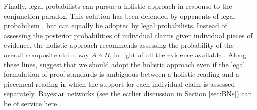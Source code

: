 \documentclass{article}
\begin{document}
 
 
 
 Finally, legal probabilists  can pursue a holistic approach in response to the conjunction paradox. %
 This solution has been defended  by opponents of legal probabilism \citep{Allen1986A-Reconceptuali,AllenPardo2019relative}, but can equally be adopted by legal probabilists. 
   Instead of assessing the posterior probabilities of individual claims given individual pieces of evidence, the holistic approach recommends assessing the probability of the overall composite claim, say $A \wedge B$, in light of all the evidence available \citep{dibello2019TrialStatisticsHigh}. Along these lines, \citet{HeddenColyvan2019legal} suggest that we should adopt the holistic approach even if the legal formulation of proof standards is ambiguous between a holistic reading and a piecemeal reading in which the support for each individual claim is assessed separately. 
   Bayesian networks (see the earlier discussion in Section \ref{sec:BNs}) 
   can be of service here  \citep{dezoete2018CombiningMultiplePieces,dezoete2017CombiningForensicEvidencea,Fenton2019Modelling}. 
   
 
 
\end{document}

